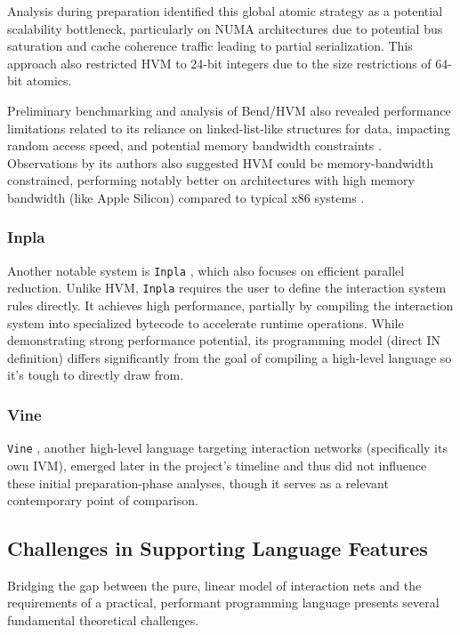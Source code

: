 Analysis during preparation identified this global atomic strategy as a potential scalability bottleneck, particularly on NUMA architectures due to potential bus saturation and cache coherence traffic leading to partial serialization. This approach also restricted HVM to 24-bit integers due to the size restrictions of 64-bit atomics.

Preliminary benchmarking and analysis of Bend/HVM also revealed performance limitations related to its reliance on linked-list-like structures for data, impacting random access speed, and potential memory bandwidth constraints \cite{BreakingTheBend}. Observations by its authors also suggested HVM could be memory-bandwidth constrained, performing notably better on architectures with high memory bandwidth (like Apple Silicon) compared to typical x86 systems \cite{HVMGithub}.

\subsubsection{Inpla}

Another notable system is \texttt{Inpla} \cite{inpla}, which also focuses on efficient parallel reduction. Unlike HVM, \texttt{Inpla} requires the user to define the interaction system rules directly. It achieves high performance, partially by compiling the interaction system into specialized bytecode to accelerate runtime operations. While demonstrating strong performance potential, its programming model (direct IN definition) differs significantly from the goal of compiling a high-level language so it's tough to directly draw from.

\subsubsection{Vine}

\texttt{Vine} \cite{VineGithub}, another high-level language targeting interaction networks (specifically its own IVM), emerged later in the project's timeline and thus did not influence these initial preparation-phase analyses, though it serves as a relevant contemporary point of comparison.

\subsection{Challenges in Supporting Language Features}\label{sec:prep_research_features}

Bridging the gap between the pure, linear model of interaction nets and the requirements of a practical, performant programming language presents several fundamental theoretical challenges.

